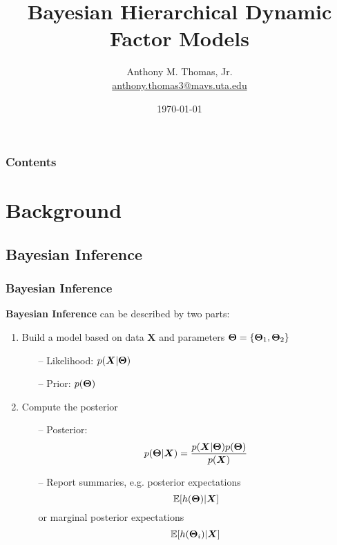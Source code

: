 \documentclass[10pt, compress, notheorems, aspectratio=169]{beamer}
\let\originalleft\left
\let\originalright\right
\renewcommand{\left}{\mathopen{}\mathclose \bgroup \originalleft}
\renewcommand{\right}{\aftergroup \egroup \originalright}
\newcommand{\E}{\mathbb{E}}
\begin{document}
\title{Bayesian Hierarchical Dynamic Factor Models}
     
\author{
	Anthony M. Thomas, Jr.\\
	\footnotesize
	\href{mailto:anthony.thomas3@mavs.uta.edu}{anthony.thomas3@mavs.uta.edu}
}


\date{\today}

{
\begin{frame}[plain]
	\titlepage
\end{frame}
}

{
\begin{frame}[plain]
\frametitle{Contents}
\tableofcontents
\end{frame}
}

\section{Background}
\subsection{Bayesian Inference}
\begin{frame}
	\frametitle{Bayesian Inference}
	\textbf{Bayesian Inference} can be described by two parts:
	\begin{enumerate}
		\item Build a model based on data $\bm X$ and parameters $\bm \Theta = \left\{ {\bm \Theta}_1, {\bm \Theta}_2 \right\}$
			\begin{itemize}
				\item[--] Likelihood: $p \left( {\bm X} | {\bm \Theta} \right)$
				\item[--] Prior: $p \left( {\bm \Theta}\right)$
			\end{itemize}
		\item Compute the posterior
			\begin{itemize}
				\item[--] Posterior: $$p \left( {\bm \Theta} | {\bm X} \right) = \frac{ p \left( {\bm X} | {\bm \Theta} \right) p \left( {\bm \Theta} \right) }{ p \left( {\bm X} \right)}$$
				\item[--] Report summaries, e.g. posterior expectations
				$$\E \left[ h( {\bm \Theta} ) | {\bm X} \right]$$
				or marginal posterior expectations
				$$\E \left[ h( {\bm \Theta}_i ) | {\bm X} \right]$$	
		\end{itemize}
	\end{enumerate}
\end{frame}
\end{document}
